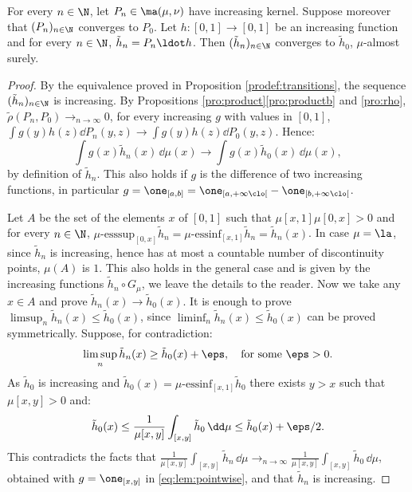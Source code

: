 \begin{lem}\label{lem:pointwise}
For every $n\in \N$, let $P_n\in \ma(\mu,\nu)$ have increasing kernel. Suppose moreover that $(P_n)_{n\in\N}$ converges to $P_0$. Let $h:[0,1]\to [0,1]$ be an increasing function and for every $n\in \N$, $\tilde{h}_n=P_{n}{}\ldot h$. Then $(\tilde h_n)_{n\in\N}$ converges to $\tilde h_0$, $\mu$-almost surely.
\end{lem}
\begin{proof}By the equivalence proved in Proposition \ref{prodef:transitions}, the sequence $(\tilde h_n)_{n\in \N}$ is increasing. By Propositions \ref{pro:product}\eqref{pro:productb} and \ref{pro:rho}, $\tilde{\rho}(P_n,P_0)\to_{n\to\infty} 0$, \ie for every increasing $g$ with values in $[0,1]$, $\int g(y)h(z) \dd P_n(y,z)\to \int g(y)h(z)\dd P_0(y,z)$. Hence:\vspace*{-3pt}%
\begin{equation}\label{eq:lem:pointwise}
\int g(x)\tilde{h}_n(x)\,\dd \mu(x)\to \int g(x)\tilde{h}_0(x)\,\dd \mu(x),
\end{equation}
by definition of $\tilde h_n$. This also holds if $g$ is the difference of two increasing functions, in particular $g=\one_{[a,b]}=\one_{[a,+\infty\clo[}-\one_{[b,+\infty\clo[}$.

Let $A$ be the set of the elements $x$ of $[0,1]$ such that $\mu[x,1]\mu[0,x]>0$ and for every $n\in \N$, $\mu\text{-}\mathrm{esssup}_{[0,x]}\tilde{h}_n=\mu\text{-}\mathrm{essinf}_{[x,1]}\tilde{h}_n=\tilde{h}_n(x)$. In case $\mu=\la$, since $\tilde h_n$ is increasing, hence has at most a countable number of discontinuity points, $\mu(A)$ is $1$. This also holds in the general case and is given by the increasing functions $\tilde{h}_n\circ G_\mu$, we leave the details to the reader. Now we take any $x\in A$ and prove $\tilde h_n(x)\to\tilde h_0(x)$. It is enough to prove $\limsup_{n}\tilde{h}_n(x)\leq \tilde{h}_0(x)$, since $\liminf_{n}\tilde{h}_n(x)\leq \tilde{h}_0(x)$ can be proved symmetrically. Suppose, for contradiction:\vspace*{-3pt}
\[\limsup_{n}\tilde{h}_n(x)\geq \tilde{h}_0(x)+\eps,\quad \text{for some $\eps>0$.}\]
As $\tilde{h}_{0}$ is increasing and $\tilde{h}_0(x)=\mu\text{-}\mathrm{essinf}_{[x,1]}\tilde{h}_0$ there exists $y>x$ such that $\mu[x,y]>0$ and:\vspace*{-3pt}
\[\tilde{h}_0(x)\leq\frac1{\mu[x,y]} \int_{[x,y]}\tilde{h}_0\,\dd\mu\leq \tilde{h}_0(x)+\eps/2.\]
This contradicts the facts that $\frac1{\mu[x,y]} \int_{[x,y]}\tilde{h}_n\,\dd\mu\to_{n\to\infty}\frac1{\mu[x,y]} \int_{[x,y]}\tilde{h}_0\,\dd\mu$, obtained with $g=\one_{[x,y]}$ in \eqref{eq:lem:pointwise}, and that $\tilde h_n$ is increasing.
\end{proof}

